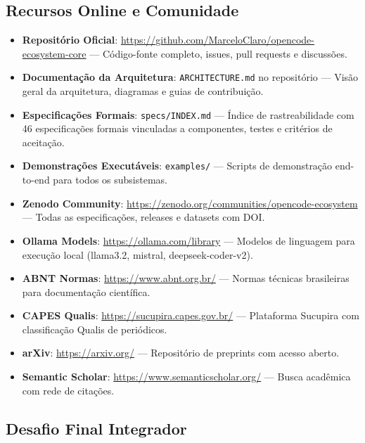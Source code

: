 \subsection{Recursos Online e Comunidade}
\label{sec:recursos-online}

\begin{itemize}
  \item \textbf{Repositório Oficial}: \url{https://github.com/MarceloClaro/opencode-ecosystem-core} — Código-fonte completo, issues, pull requests e discussões.
  
  \item \textbf{Documentação da Arquitetura}: \texttt{ARCHITECTURE.md} no repositório — Visão geral da arquitetura, diagramas e guias de contribuição.
  
  \item \textbf{Especificações Formais}: \texttt{specs/INDEX.md} — Índice de rastreabilidade com 46 especificações formais vinculadas a componentes, testes e critérios de aceitação.
  
  \item \textbf{Demonstrações Executáveis}: \texttt{examples/} — Scripts de demonstração end-to-end para todos os subsistemas.
  
  \item \textbf{Zenodo Community}: \url{https://zenodo.org/communities/opencode-ecosystem} — Todas as especificações, releases e datasets com DOI.
  
  \item \textbf{Ollama Models}: \url{https://ollama.com/library} — Modelos de linguagem para execução local (llama3.2, mistral, deepseek-coder-v2).
  
  \item \textbf{ABNT Normas}: \url{https://www.abnt.org.br/} — Normas técnicas brasileiras para documentação científica.
  
  \item \textbf{CAPES Qualis}: \url{https://sucupira.capes.gov.br/} — Plataforma Sucupira com classificação Qualis de periódicos.
  
  \item \textbf{arXiv}: \url{https://arxiv.org/} — Repositório de preprints com acesso aberto.
  
  \item \textbf{Semantic Scholar}: \url{https://www.semanticscholar.org/} — Busca acadêmica com rede de citações.
\end{itemize}

\subsection{Desafio Final Integrador}
\label{sec:desafio-final}

